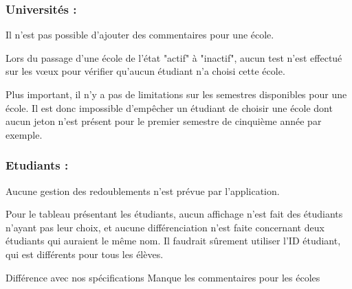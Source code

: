 \subsubsection{Universités :}
Il n'est pas possible d'ajouter des commentaires pour une école.

Lors du passage d'une école de l'état "actif" à "inactif", aucun test n'est effectué sur les vœux pour vérifier qu'aucun étudiant n'a choisi cette école.

Plus important, il n'y a pas de limitations sur les semestres disponibles pour une école. Il est donc impossible d'empêcher un étudiant de choisir une école dont aucun jeton n'est présent pour le premier semestre de cinquième année par exemple.


\subsubsection{Etudiants :}
Aucune gestion des redoublements n'est prévue par l'application.

Pour le tableau présentant les étudiants, aucun affichage n'est fait des étudiants n'ayant pas leur choix, et aucune différenciation n'est faite concernant deux étudiants qui auraient le même nom. Il faudrait sûrement utiliser l'ID étudiant, qui est différents pour tous les élèves.


Différence avec nos spécifications
Manque les commentaires pour les écoles


